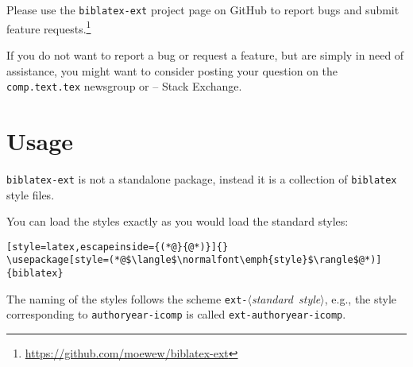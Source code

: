 \documentclass{ltxdockit}
\def\sty{\texttt}
\newcommand*{\gitbaseurl}{https://github.com/moewew/biblatex-ext}
\begin{document}
Please use the \sty{biblatex-ext} project page on GitHub to report bugs and
submit feature requests.\footnote{\url{\gitbaseurl}}

If you do not want to report a bug or request a feature, but are simply in need
of assistance, you might want to consider posting your question on the
\texttt{comp.text.tex} newsgroup or \tex{} -- \latex Stack Exchange.%

\section{Usage}

\sty{biblatex-ext} is not a standalone package, instead it is a collection of
\sty{biblatex} style files.

You can load the styles exactly as you would load the standard styles:
\begin{lstlisting}[style=latex,escapeinside={(*@}{@*)}]{}
\usepackage[style=(*@$\langle$\normalfont\emph{style}$\rangle$@*)]{biblatex}
\end{lstlisting}

The naming of the styles follows the scheme
\mbox{\texttt{ext-}$\langle$\emph{standard style}$\rangle$}, e.g.,
the style corresponding to \texttt{authoryear-icomp} is called
\texttt{ext-authoryear-icomp}.
\end{document}
